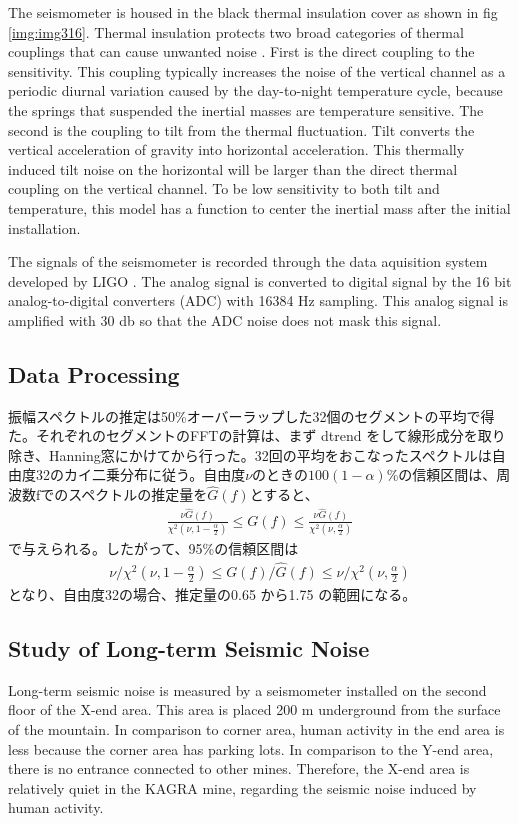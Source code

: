 The seismometer is housed in the black thermal insulation cover as shown in fig \ref{img:img316}. Thermal insulation protects two broad categories of thermal couplings that can cause unwanted noise \cite{trillium120manual}. First is the direct coupling to the sensitivity. This coupling typically increases the noise of the vertical channel as a periodic diurnal variation caused by the day-to-night temperature cycle, because the springs that suspended the inertial masses are temperature sensitive. The second is the coupling to tilt from the thermal fluctuation. Tilt converts the vertical acceleration of gravity into horizontal acceleration. This thermally induced tilt noise on the horizontal will be larger than the direct thermal coupling on the vertical channel. To be low sensitivity to both tilt and temperature, this model has a function to center the inertial mass after the initial installation.

The signals of the seismometer is recorded through the data aquisition system developed by LIGO \cite{bork2001overview}. The analog signal is converted to digital signal by the 16 bit analog-to-digital converters (ADC) with 16384 $\mathrm{Hz}$ sampling. This analog signal is amplified with 30 db so that the ADC noise does not mask this signal. 

\subsection{Data Processing}
振幅スペクトルの推定は50\%オーバーラップした32個のセグメントの平均で得た。それぞれのセグメントのFFTの計算は、まず dtrend をして線形成分を取り除き、Hanning窓にかけてから行った。32回の平均をおこなったスペクトルは自由度32のカイ二乗分布に従う。自由度$\nu$のときの$100(1-\alpha)$\%の信頼区間は、周波数$\mathrm{f}$でのスペクトルの推定量を$\hat{G}(f)$とすると、
\begin{eqnarray}
  \frac{\nu{\hat{G}(f)}}{\chi^2(\nu,1-\frac{\alpha}{2})} \leq G(f) \leq \frac{\nu{\hat{G}(f)}}{\chi^2(\nu,\frac{\alpha}{2})}
\end{eqnarray}
で与えられる。したがって、95\%の信頼区間は
\begin{eqnarray}
  \nu/\chi^2(\nu,1-\frac{\alpha}{2}) \leq G(f)/\hat{G}(f) \leq \nu/\chi^2(\nu,\frac{\alpha}{2})
\end{eqnarray}
となり、自由度32の場合、推定量の0.65 から1.75 の範囲になる。

\subsection{Study of Long-term Seismic Noise}
Long-term seismic noise is measured by a seismometer installed on the second floor of the X-end area. This area is placed 200 $\mathrm{m}$ underground from the surface of the mountain. In comparison to corner area, human activity in the end area is less because the corner area has parking lots. In comparison to the Y-end area, there is no entrance connected to other mines. Therefore, the X-end area is relatively quiet in the KAGRA mine, regarding the seismic noise induced by human activity. 

